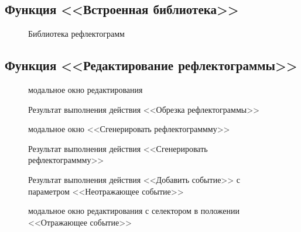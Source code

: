 \subsection{Функция <<Встроенная библиотека>>}

\begin{figure}[H]
  \caption{Библиотека рефлектограмм}
  \label{ris:library}
\end{figure}

\subsection{Функция <<Редактирование рефлектограммы>>}

\begin{figure}[H]
  \caption{\Gls{модальное окно} редактирования}
  \label{ris:edit_modal}
\end{figure}

\begin{figure}[H]
  \caption{Результат выполнения действия <<Обрезка рефлектограммы>>}
  \label{ris:cut_result}
\end{figure}

\begin{figure}[H]
  \caption{\Gls{модальное окно} <<Сгенерировать рефлектограммму>>}
  \label{ris:generate}
\end{figure}

\begin{figure}[H]
  \caption{Результат выполнения действия <<Сгенерировать рефлектограммму>>}
  \label{ris:generate_result}
\end{figure}

\begin{figure}[H]
  \caption{Результат выполнения действия <<Добавить событие>> с параметром <<Неотражающее событие>>}
  \label{ris:loss_event_added}
\end{figure}

\begin{figure}[H]
  \caption{\Gls{модальное окно} редактирования с селектором в положении <<Отражающее событие>>}
  \label{ris:edit_modal_reflection}
\end{figure}

